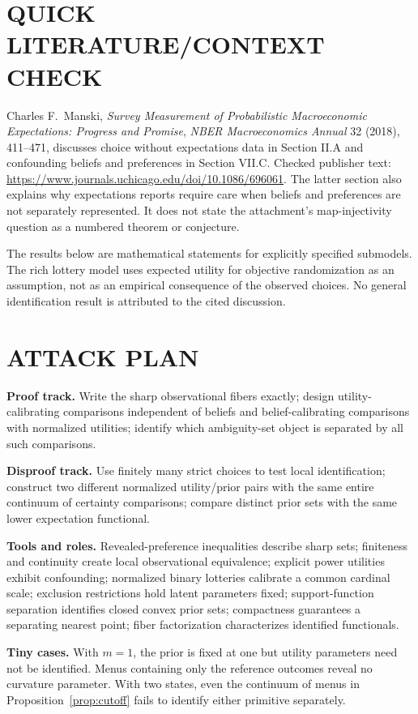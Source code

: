 \documentclass[11pt,a4paper]{article}
\theoremstyle{definition}\newtheorem{definition}[theorem]{Definition}
\theoremstyle{remark}\newtheorem{remark}[theorem]{Remark}
\newcommand{\1}{\mathbf 1}
\begin{document}
\section{QUICK LITERATURE/CONTEXT CHECK}
Charles F.~Manski, \emph{Survey Measurement of Probabilistic Macroeconomic Expectations: Progress and Promise}, \emph{NBER Macroeconomics Annual} 32 (2018), 411--471, discusses choice without expectations data in Section II.A and confounding beliefs and preferences in Section VII.C. Checked publisher text: \url{https://www.journals.uchicago.edu/doi/10.1086/696061}. The latter section also explains why expectations reports require care when beliefs and preferences are not separately represented. It does not state the attachment's map-injectivity question as a numbered theorem or conjecture.

The results below are mathematical statements for explicitly specified submodels. The rich lottery model uses expected utility for objective randomization as an assumption, not as an empirical consequence of the observed choices. No general identification result is attributed to the cited discussion.

\section{ATTACK PLAN}
\textbf{Proof track.} Write the sharp observational fibers exactly; design utility-calibrating comparisons independent of beliefs and belief-calibrating comparisons with normalized utilities; identify which ambiguity-set object is separated by all such comparisons.

\textbf{Disproof track.} Use finitely many strict choices to test local identification; construct two different normalized utility/prior pairs with the same entire continuum of certainty comparisons; compare distinct prior sets with the same lower expectation functional.

\textbf{Tools and roles.} Revealed-preference inequalities describe sharp sets; finiteness and continuity create local observational equivalence; explicit power utilities exhibit confounding; normalized binary lotteries calibrate a common cardinal scale; exclusion restrictions hold latent parameters fixed; support-function separation identifies closed convex prior sets; compactness guarantees a separating nearest point; fiber factorization characterizes identified functionals.

\textbf{Tiny cases.} With $m=1$, the prior is fixed at one but utility parameters need not be identified. Menus containing only the reference outcomes reveal no curvature parameter. With two states, even the continuum of menus in Proposition~\ref{prop:cutoff} fails to identify either primitive separately.
\end{document}
